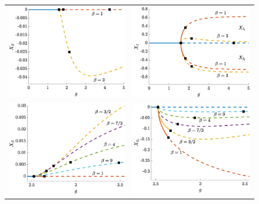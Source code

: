 \documentclass[11pt,reqno]{amsart}
\begin{document}
\begin{figure}
    \centering
    \begin{tabular}{cc}
    \includegraphics[width=8cm]{images/bdnoclusters20E.eps} &
    \includegraphics[width=8cm]{images/bdnoclusters20I.eps} \\
    \includegraphics[width=8cm]{images/bdnoclusters50E.eps} &
    \includegraphics[width=8cm]{images/bdnoclusters50I.eps}

\end{tabular}
\end{figure}
\end{document}
